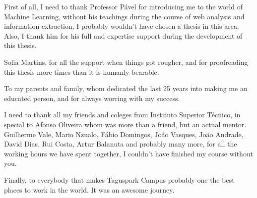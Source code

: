 \begin{acknowledgments}
  First of all, I need to thank Professor Pável for introducing me to the world of Machine Learning, without his teachings during the course of web analysis and information extraction, I probably wouldn't have chosen a thesis in this area. Also, I thank him for his full and expertise support during the development of this thesis. 

  Sofia Martins, for all the support when things got rougher, and for proofreading this thesis more times than it is humanly bearable.

  To my parents and family, whom dedicated the last 25 years into making me an educated person, and for always worring with my success.

  I need to thank all my friends and coleges from Instituto Superior Técnico, in special to Afonso Oliveira whom was more than a friend, but an actual mentor. Guilherme Vale, Mario Nzualo, Fábio Domingos, João Vasques, João Andrade, David Dias, Rui Costa, Artur Balanuta and probably many more, for all the working hours we have spent together, I couldn't have finished my course without you.

  Finally, to everybody that makes Taguspark Campus probably one the best places to work in the world. It was an awesome journey.
\end{acknowledgments}
 
